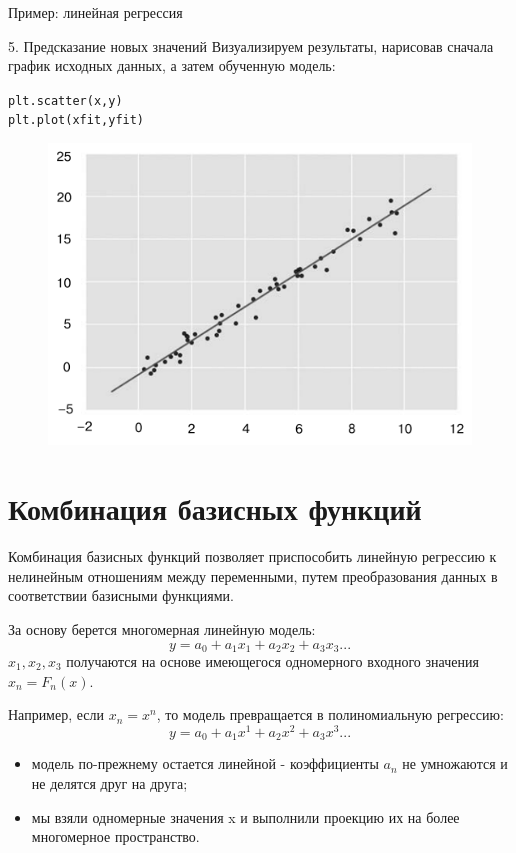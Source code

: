 \documentclass{beamer}
\begin{document}
\begin{frame}[fragile]{Пример: линейная регрессия}
\begin{block}{5. Предсказание новых значений}
Визуализируем результаты, нарисовав сначала график исходных данных, а затем обученную модель:
\begin{alltt}
plt.scatter(x, y)
plt.plot(xfit, yfit)
\end{alltt}
\end{block}
\begin{figure}[h]
\centering
\includegraphics[scale=0.4]{images/ex-01-02.png}
\end{figure}
\end{frame}

\section{Комбинация базисных функций}

\begin{frame}[fragile]
\begin{block}{Комбинация базисных функций}
позволяет приспособить линейную регрессию к нелинейным отношениям между переменными, путем преобразования данных в соответствии базисными функциями. 
\end{block}
За основу берется многомерная линейную модель:
\[y = a_0+a_1x_1+a_2x_2+a_3x_3...\]
$x_1, x_2, x_3$ получаются на основе имеющегося одномерного входного значения $x_n=F_n(x)$.

Например, если $x_n = x^n$, то модель превращается в полиномиальную регрессию:
\[y = a_0+a_1x^1+a_2x^2+a_3x^3...\]
\begin{itemize}
\item модель по-прежнему остается линейной - коэффициенты $a_n$ не умножаются и не делятся друг на друга;
\item мы взяли одномерные значения x и выполнили проекцию их на более многомерное пространство.
\end{itemize}
\end{frame}
\end{document}
